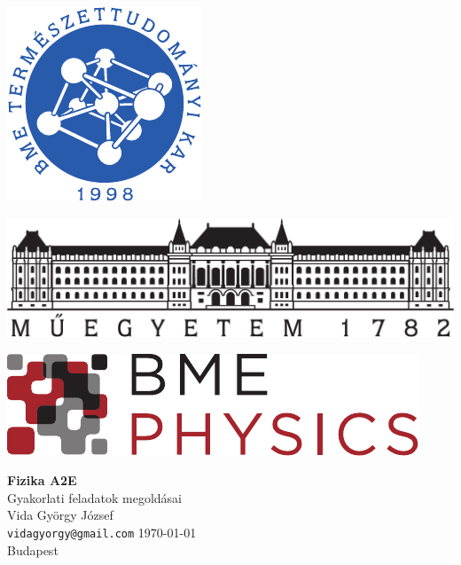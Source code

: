 \begin{center}
   \begin{minipage}[c]{0.3\textwidth}
    \begin{center}
    \includegraphics[width=\textwidth,height=0.1\textheight,keepaspectratio]{figures/TTK_sz_felirattal}
    \end{center}
   \end{minipage}
   \hspace*{12pt}
   \begin{minipage}[c]{0.4\textwidth}
    \includegraphics[width=\textwidth]{figures/bme_logo_kicsi}
   \end{minipage}
   \hspace*{20pt}
   \begin{minipage}[c]{0.3\textwidth}
    \includegraphics[width=\textwidth]{figures/BMEPHYSICSlogo}
   \end{minipage}   
   
   \vspace*{4cm}
   {\bf \Huge Fizika A2E }\\[12pt]
   {\LARGE Gyakorlati feladatok megoldásai}\\[2.5cm]
   {\LARGE Vida György József}\\
   {\large\texttt{vidagyorgy@gmail.com}}
 \vfill  
 {\large \today} \\
 {Budapest} 
 \end{center}


